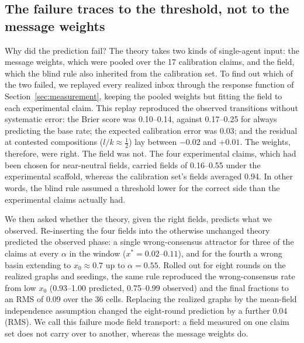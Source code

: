 \documentclass[11pt]{article}
\begin{document}
\subsection{The failure traces to the threshold, not to the message weights}

Why did the prediction fail? The theory takes two kinds of single-agent
input: the message weights, which were pooled over the 17 calibration
claims, and the field, which the blind rule also inherited from the
calibration set. To find out which of the two failed, we replayed every
realized inbox through the response function of
Section~\ref{sec:measurement}, keeping the pooled weights but fitting the
field to each experimental claim. This replay reproduced the observed
transitions without systematic error: the Brier score was 0.10--0.14,
against 0.17--0.25 for always predicting the base rate; the expected
calibration error was 0.03; and the residual at contested compositions
($l/k \approx \tfrac12$) lay between $-0.02$ and $+0.01$. The weights,
therefore, were right. The field was not. The four experimental claims,
which had been chosen for near-neutral fields, carried fields of 0.16--0.55
under the experimental scaffold, whereas the calibration set's fields
averaged 0.94. In other words, the blind rule assumed a threshold lower for
the correct side than the experimental claims actually had.

We then asked whether the theory, given the right fields, predicts what we
observed. Re-inserting the four fields into the otherwise unchanged theory
predicted the observed phase: a single wrong-consensus attractor for three
of the claims at every $\alpha$ in the window ($x^* = 0.02$--$0.11$), and
for the fourth a wrong basin extending to $x_0 \approx 0.7$ up to
$\alpha = 0.55$. Rolled out for eight rounds on the realized graphs and
seedings, the same rule reproduced the wrong-consensus rate from low $x_0$
(0.93--1.00 predicted, 0.75--0.99 observed) and the final fractions to an
RMS of 0.09 over the 36 cells. Replacing the realized graphs by the
mean-field independence assumption changed the eight-round prediction by a
further 0.04 (RMS). We call this failure mode field transport: a field
measured on one claim set does not carry over to another, whereas the
message weights do.
\end{document}
